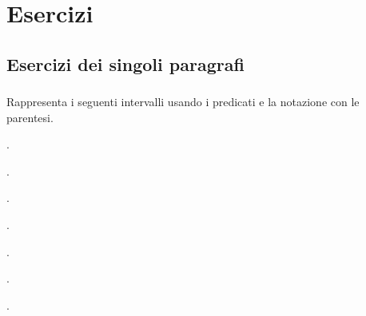 
\section{Esercizi}

\subsection{Esercizi dei singoli paragrafi}

\subsubsection*{}

\begin{esercizio}
 \label{ese:dis_1}
 Rappresenta i seguenti intervalli usando i predicati e la notazione con le 
 parentesi.
 \begin{enumeratea}
\item .

\vspace{-18pt}

\item .

\vspace{-18pt}

\item .

\vspace{-18pt}

\item .

\vspace{-18pt}

\item .

\vspace{-18pt}

\item .

\vspace{-18pt}

\item .

\vspace{-18pt}

\end{enumeratea}
\end{esercizio}

